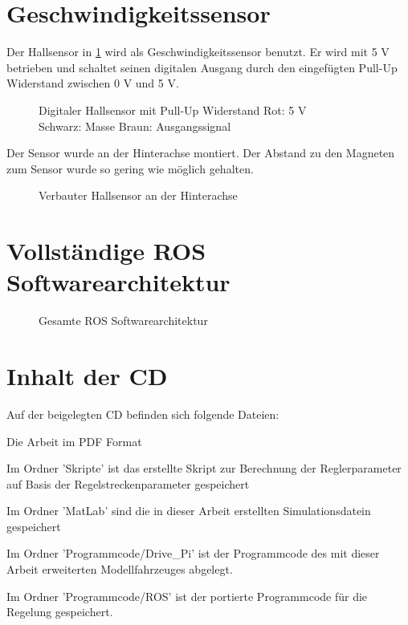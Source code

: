 \section{Geschwindigkeitssensor}
Der Hallsensor in \ref{fig:Hall} wird als Geschwindigkeitssensor benutzt. Er wird mit 5 V betrieben und schaltet seinen digitalen Ausgang durch den eingefügten Pull-Up Widerstand zwischen 0 V und 5 V.
\begin{figure}[H]
  \centering
  \caption[Digitaler Hallsensor mit Pull-Up Widerstand]{Digitaler Hallsensor mit Pull-Up Widerstand Rot: 5 V \\
  Schwarz: Masse Braun: Ausgangssignal}
  \label{fig:Hall}
\end{figure}
Der Sensor wurde an der Hinterachse montiert. Der Abstand zu den Magneten zum Sensor wurde so gering wie möglich gehalten.
\begin{figure}[H]
  \centering
  \caption[Verbauter Hallsensor]{Verbauter Hallsensor an der Hinterachse}
  \label{fig:HallAuto}
\end{figure}
\section{Vollständige ROS Softwarearchitektur}
\begin{figure}[H]
  \centering
  \caption[Gesamte ROS Softwarearchitektur]{Gesamte ROS Softwarearchitektur}
  \label{fig:HallAuto}
\end{figure}
\section{Inhalt der CD}
Auf der beigelegten CD befinden sich folgende Dateien:
\begin{compactitem}
  \item Die Arbeit im PDF Format
  \item Im Ordner 'Skripte' ist das erstellte Skript zur Berechnung der Reglerparameter auf Basis der Regelstreckenparameter gespeichert
  \item Im Ordner 'MatLab' sind die in dieser Arbeit erstellten Simulationsdatein ge\-speich\-ert
  \item Im Ordner 'Programmcode/Drive\_Pi' ist der Programmcode des mit dieser Arbeit erweiterten Modellfahrzeuges abgelegt.
  \item Im Ordner 'Programmcode/ROS' ist der portierte Programmcode für die Regelung gespeichert.
\end{compactitem}
